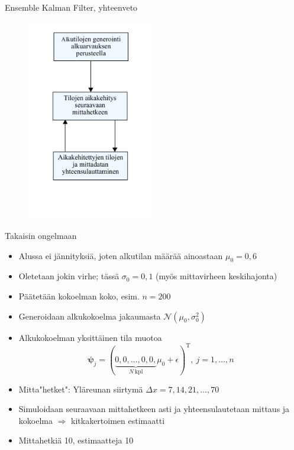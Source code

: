 \documentclass{beamer}
\begin{document}
\begin{frame}{Ensemble Kalman Filter, yhteenveto}

\begin{figure}
\includegraphics[width=5.5cm]{enkf_luuppi.pdf}
\end{figure}

\end{frame}

\begin{frame}{Takaisin ongelmaan}

\begin{itemize}
\item Alussa ei jännityksiä, joten alkutilan määrää ainoastaan $\mu_0 = 0{,}6$
\item Oletetaan jokin virhe; tässä $\sigma_0 = 0{,}1$ (myös mittavirheen keskihajonta)
\item Päätetään kokoelman koko, esim. $n=200$
\item Generoidaan alkukokoelma jakaumasta $\mathcal{N}(\mu_0,\sigma_0^2)$
\item Alkukokoelman yksittäinen tila muotoa
\[
\boldsymbol{\psi}_j = (\underbrace{0, 0, \dots, 0, 0,}_{N~\text{kpl}} \mu_0 + \epsilon )^\mathrm{T},~j=1,\dots,n
\]
\item Mitta"hetket": Yläreunan siirtymä $\Delta x = 7,14,21,\dots,70$
\item Simuloidaan seuraavaan mittahetkeen asti ja yhteensulautetaan mittaus ja kokoelma $\Rightarrow$ kitkakertoimen estimaatti
\item Mittahetkiä 10, estimaatteja 10
\end{itemize}

\end{frame}
\end{document}

